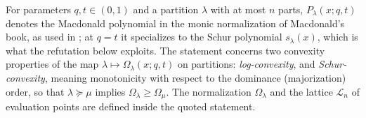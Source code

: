 For parameters $q,t\in(0,1)$ and a partition $\lambda$ with at most $n$ parts, $P_\lambda(x;q,t)$ denotes the Macdonald polynomial in the monic normalization of Macdonald's book, as used in \citet{McSwiggenSahi2026}; at $q=t$ it specializes to the Schur polynomial $s_\lambda(x)$, which is what the refutation below exploits.  The statement concerns two convexity properties of the map $\lambda\mapsto\Omega_\lambda(x;q,t)$ on partitions: \emph{log-convexity}, and \emph{Schur-convexity}, meaning monotonicity with respect to the dominance (majorization) order, so that $\lambda\succeq\mu$ implies $\Omega_\lambda\ge\Omega_\mu$.  The normalization $\Omega_\lambda$ and the lattice $\mathcal L_n$ of evaluation points are defined inside the quoted statement.
